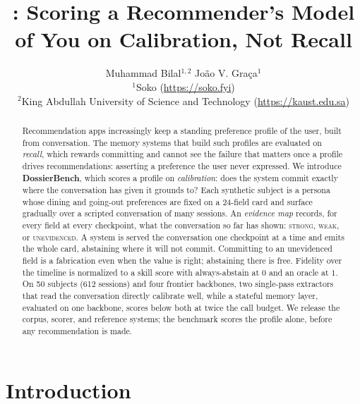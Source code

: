 \documentclass{article}
\title{\bench: Scoring a Recommender's Model of You on Calibration, Not Recall}
\author{%
  Muhammad Bilal$^{1,2}$ \qquad Jo\~{a}o V. Gra\c{c}a$^{1}$\\
  $^{1}$Soko (\url{https://soko.fyi})\\
  $^{2}$King Abdullah University of Science and Technology (\url{https://kaust.edu.sa})
}
\newcommand{\bench}{DossierBench}
\begin{document}
\maketitle

\begin{abstract}
Recommendation apps increasingly keep a standing preference profile of the user, built from
conversation. The memory systems that build such profiles are evaluated on \emph{recall}, which
rewards committing and cannot see the failure that matters once a profile drives recommendations:
asserting a preference the user never expressed. We introduce \textbf{\bench}, which scores a
profile on \emph{calibration}: does the system commit exactly where the conversation has given it
grounds to? Each synthetic subject is a persona whose dining and going-out preferences are fixed on
a 24-field card and surface gradually over a scripted conversation of many sessions. An
\emph{evidence map} records, for every field at every checkpoint, what the conversation so far has
shown: \textsc{strong}, \textsc{weak}, or \textsc{unevidenced}. A system is served the conversation
one checkpoint at a time and emits the whole card, abstaining where it will not commit. Committing
to an unevidenced field is a fabrication even when the value is right; abstaining there is free.
Fidelity over the timeline is normalized to a skill score with always-abstain at $0$ and an oracle
at $1$. On 50 subjects (612 sessions) and four frontier backbones, two single-pass extractors that
read the conversation directly calibrate well, while a stateful memory layer, evaluated on one
backbone, scores below both at twice the call budget. We release the corpus,
scorer, and reference systems; the benchmark scores the profile alone, before any recommendation is
made.
\end{abstract}

\section{Introduction}
\end{document}

